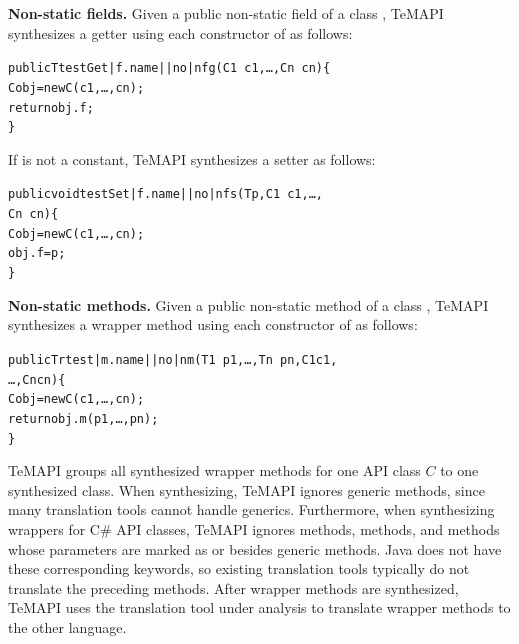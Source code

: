 \textbf{Non-static fields.} Given a public non-static field  of a class , TeMAPI synthesizes a getter using each constructor  of  as follows:

\begin{CodeOut}%
\begin{alltt}
 public T testGet|f.name||no|nfg(C1\ c1,\ldots, Cn\ cn)\{
    C obj = new C(c1,\ldots, cn);
    return obj.f;
 \}
\end{alltt}
\end{CodeOut}%

If  is not a constant, TeMAPI synthesizes a setter as follows:

\begin{CodeOut}%
\begin{alltt}
 public void testSet|f.name||no|nfs(T p, C1\ c1,\ldots,
                                              Cn\ cn)\{
   C obj = new C(c1,\ldots, cn);
   obj.f = p;
 \}
\end{alltt}
\end{CodeOut}%

\textbf{Non-static methods.} Given a public non-static method  of a class , TeMAPI synthesizes a wrapper method using each constructor  of  as follows:

\begin{CodeOut}%
\begin{alltt}
 public Tr test|m.name||no|nm(T1\ p1,\ldots, Tn\ pn, C1 c1,
                                           \ldots, Cn cn)\{
   C obj = new C(c1,\ldots, cn);
   return obj.m(p1,\ldots, pn);
 \}
\end{alltt}
\end{CodeOut}%


TeMAPI groups all synthesized wrapper methods for one API class $C$ to one synthesized class. When synthesizing, TeMAPI ignores generic methods, since many translation tools cannot handle generics. Furthermore, when synthesizing wrappers for C\# API classes, TeMAPI ignores  methods,  methods, and methods whose parameters are marked as  or  besides generic methods. Java does not have these corresponding keywords, so existing translation tools typically do not translate the preceding methods. After wrapper methods are synthesized, TeMAPI uses the translation tool under analysis to translate wrapper methods to the other language.

